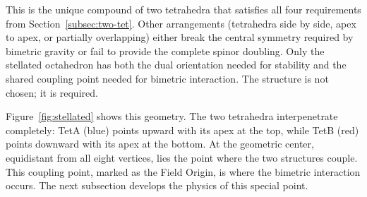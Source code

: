 \documentclass[aps,prd,preprint,superscriptaddress,showpacs,preprintnumbers,amsmath,amssymb,nofootinbib]{revtex4-2}
\begin{document}
This is the unique compound of two tetrahedra that satisfies all four requirements from Section~\ref{subsec:two-tet}. Other arrangements (tetrahedra side by side, apex to apex, or partially overlapping) either break the central symmetry required by bimetric gravity or fail to provide the complete spinor doubling. Only the stellated octahedron has both the dual orientation needed for stability and the shared coupling point needed for bimetric interaction. The structure is not chosen; it is required.

Figure~\ref{fig:stellated} shows this geometry. The two tetrahedra interpenetrate completely: TetA (blue) points upward with its apex at the top, while TetB (red) points downward with its apex at the bottom. At the geometric center, equidistant from all eight vertices, lies the point where the two structures couple. This coupling point, marked as the Field Origin, is where the bimetric interaction occurs. The next subsection develops the physics of this special point.
\end{document}
